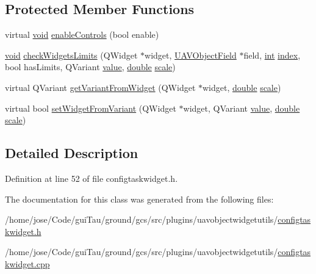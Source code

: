 \subsection*{Protected Member Functions}
\begin{DoxyCompactItemize}
\item 
virtual \hyperlink{group___u_a_v_objects_plugin_ga444cf2ff3f0ecbe028adce838d373f5c}{void} \hyperlink{group___u_a_v_object_widget_utils_gaad59e4e96d1e4a59067aa44828ddaa3f}{enable\-Controls} (bool enable)
\item 
\hyperlink{group___u_a_v_objects_plugin_ga444cf2ff3f0ecbe028adce838d373f5c}{void} \hyperlink{group___u_a_v_object_widget_utils_ga087b6f8f17317793efa0d121fe42336a}{check\-Widgets\-Limits} (Q\-Widget $\ast$widget, \hyperlink{class_u_a_v_object_field}{U\-A\-V\-Object\-Field} $\ast$field, \hyperlink{ioapi_8h_a787fa3cf048117ba7123753c1e74fcd6}{int} \hyperlink{glext_8h_ab47dd9958bcadea08866b42bf358e95e}{index}, bool has\-Limits, Q\-Variant \hyperlink{glext_8h_aa0e2e9cea7f208d28acda0480144beb0}{value}, \hyperlink{_super_l_u_support_8h_a8956b2b9f49bf918deed98379d159ca7}{double} \hyperlink{glext_8h_a281421b881aa7a1266842b73a3bc7655}{scale})
\item 
virtual Q\-Variant \hyperlink{group___u_a_v_object_widget_utils_ga0bc84dd39dc77fccf26bf3a708a11733}{get\-Variant\-From\-Widget} (Q\-Widget $\ast$widget, \hyperlink{_super_l_u_support_8h_a8956b2b9f49bf918deed98379d159ca7}{double} \hyperlink{glext_8h_a281421b881aa7a1266842b73a3bc7655}{scale})
\item 
virtual bool \hyperlink{group___u_a_v_object_widget_utils_gac37260311f36d40dcb9dce65e025c426}{set\-Widget\-From\-Variant} (Q\-Widget $\ast$widget, Q\-Variant \hyperlink{glext_8h_aa0e2e9cea7f208d28acda0480144beb0}{value}, \hyperlink{_super_l_u_support_8h_a8956b2b9f49bf918deed98379d159ca7}{double} \hyperlink{glext_8h_a281421b881aa7a1266842b73a3bc7655}{scale})
\end{DoxyCompactItemize}


\subsection{Detailed Description}


Definition at line 52 of file configtaskwidget.\-h.



The documentation for this class was generated from the following files\-:\begin{DoxyCompactItemize}
\item 
/home/jose/\-Code/gui\-Tau/ground/gcs/src/plugins/uavobjectwidgetutils/\hyperlink{configtaskwidget_8h}{configtaskwidget.\-h}\item 
/home/jose/\-Code/gui\-Tau/ground/gcs/src/plugins/uavobjectwidgetutils/\hyperlink{configtaskwidget_8cpp}{configtaskwidget.\-cpp}\end{DoxyCompactItemize}
